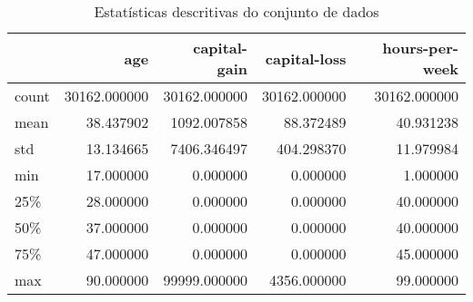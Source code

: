 \begin{table}
\centering
\caption{Estatísticas descritivas do conjunto de dados}
\label{tbl:descriptive_statistics}
\begin{tabular}{lrrrr}
\toprule
{} &           age &  capital-gain &  capital-loss &  hours-per-week \\
\midrule
count &  30162.000000 &  30162.000000 &  30162.000000 &    30162.000000 \\
mean  &     38.437902 &   1092.007858 &     88.372489 &       40.931238 \\
std   &     13.134665 &   7406.346497 &    404.298370 &       11.979984 \\
min   &     17.000000 &      0.000000 &      0.000000 &        1.000000 \\
25\%   &     28.000000 &      0.000000 &      0.000000 &       40.000000 \\
50\%   &     37.000000 &      0.000000 &      0.000000 &       40.000000 \\
75\%   &     47.000000 &      0.000000 &      0.000000 &       45.000000 \\
max   &     90.000000 &  99999.000000 &   4356.000000 &       99.000000 \\
\bottomrule
\end{tabular}
\end{table}
